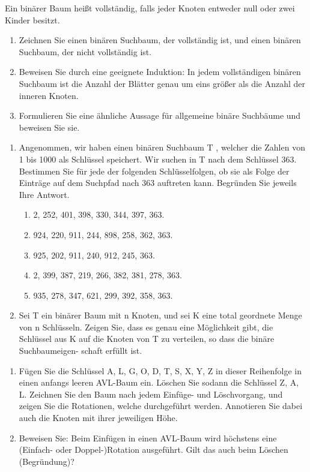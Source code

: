 \documentclass[a4paper]{assignment}
\begin{document}
\begin{problemlist}

Ein binärer Baum heißt vollständig, falls jeder Knoten entweder null oder zwei Kinder besitzt.
\begin{enumerate}
\item Zeichnen Sie einen binären Suchbaum, der vollständig ist, und einen binären Suchbaum, der nicht vollständig ist.

\item Beweisen Sie durch eine geeignete Induktion: In jedem vollständigen binären Suchbaum ist die Anzahl der Blätter genau um eins größer als die Anzahl der inneren Knoten.

\item Formulieren Sie eine ähnliche Aussage für allgemeine binäre Suchbäume und beweisen Sie sie.
\end{enumerate}


\begin{enumerate}
\item Angenommen, wir haben einen binären Suchbaum T , welcher die Zahlen von
1 bis 1000 als Schlüssel speichert. Wir suchen in T nach dem Schlüssel 363.
Bestimmen Sie für jede der folgenden Schlüsselfolgen, ob sie als Folge der
Einträge auf dem Suchpfad nach 363 auftreten kann. Begründen Sie jeweils
Ihre Antwort.
\begin{enumerate}
\item 2, 252, 401, 398, 330, 344, 397, 363.
\item 924, 220, 911, 244, 898, 258, 362, 363.
\item 925, 202, 911, 240, 912, 245, 363.
\item 2, 399, 387, 219, 266, 382, 381, 278, 363.
\item 935, 278, 347, 621, 299, 392, 358, 363.
\end{enumerate}

\item Sei T ein binärer Baum mit n Knoten, und sei K eine total geordnete Menge
von n Schlüsseln. Zeigen Sie, dass es genau eine Möglichkeit gibt, die Schlüssel
aus K auf die Knoten von T zu verteilen, so dass die binäre Suchbaumeigen-
schaft erfüllt ist.
\end{enumerate}


\begin{enumerate}
\item Fügen Sie die Schlüssel A, L, G, O, D, T, S, X, Y, Z in dieser Reihenfolge in
einen anfangs leeren AVL-Baum ein. Löschen Sie sodann die Schlüssel Z, A,
L. Zeichnen Sie den Baum nach jedem Einfüge- und Löschvorgang, und zeigen
Sie die Rotationen, welche durchgeführt werden. Annotieren Sie dabei auch
die Knoten mit ihrer jeweiligen Höhe.

\item Beweisen Sie: Beim Einfügen in einen AVL-Baum wird höchstens eine (Einfach-
oder Doppel-)Rotation ausgeführt. Gilt das auch beim Löschen (Begründung)?
\end{enumerate}


	
	
	
\end{problemlist}

\end{document}
